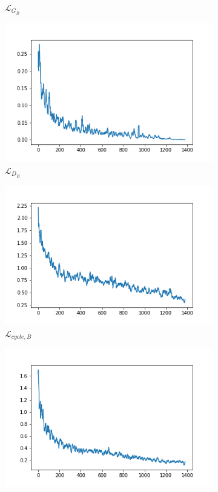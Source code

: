 \documentclass[twocolumn,11pt]{ctexart}
\begin{document}
\begin{figure}[htb]
\begin{subfigure}[b]{0.23\linewidth}
        \caption{$\mathcal{L}_{G_B}$}
      \end{subfigure}
      \begin{subfigure}[b]{0.23\linewidth}
        \includegraphics[width=\linewidth]{exp2_D_B.png}
        \caption{$\mathcal{L}_{D_B}$}
      \end{subfigure}
      \begin{subfigure}[b]{0.23\linewidth}
        \includegraphics[width=\linewidth]{exp2_cycle_B.png}
        \caption{$\mathcal{L}_{cycle,B}$}
      \end{subfigure}
      \begin{subfigure}[b]{0.23\linewidth}
        \includegraphics[width=\linewidth]{exp2_idt_B.png}

\end{subfigure}
\end{figure}
\end{document}
